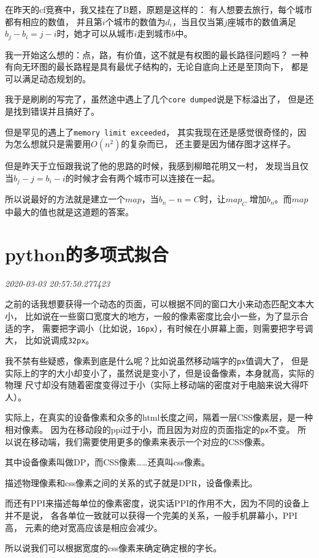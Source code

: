 \documentclass{peterlitsdoc}
\newcommand{\timetx}[1]
    {\par\noindent\emph{\pltgray\small #1}\vspace{2em}}
\newcommand{\vb}{\verb}
\begin{document}
在昨天的cf竞赛中，我又挂在了B题，原题是这样的：
有人想要去旅行，每个城市都有相应的数值，
并且第$i$个城市的数值为$d_i$，当且仅当第$j$座城市的数值满足
$b_j-b_i=j-i$时，她才可以从城市$i$走到城市$b$中。

我一开始这么想的：点，路，有价值，这不就是有权图的最长路径问题吗？
一种有向无环图的最长路程是具有最优子结构的，无论自底向上还是至顶向下，
都是可以满足动态规划的。

我于是刷刷的写完了，虽然途中遇上了几个\vb|core dumped|说是下标溢出了，
但是还是找到错误并且搞好了。

但是罕见的遇上了\vb|memory limit exceeded|，
其实我现在还是感觉很奇怪的，因为怎么想就只是需要用$O(n^2)$的复杂而已，
还主要是因为储存图才这样子。

但是昨天于立恒跟我说了他的思路的时候，我感到柳暗花明又一村，
发现当且仅当$b_j-j=b_i-i$的时候才会有两个城市可以连接在一起。

所以说最好的方法就是建立一个$map$，当$b_n-n=C$时，让$map_C$
增加$b_n$。而$map$中最大的值也就是这道题的答案。


\section{python的多项式拟合}\timetx{2020-03-03 20:57:50.277423}

之前的话我想要获得一个动态的页面，可以根据不同的窗口大小来动态匹配文本大小，
比如说在一些窗口宽度大的地方，一般的像素密度比会小一些，为了显示合适的字，
需要把字调小（比如说，\vb|16px|），有时候在小屏幕上面，则需要把字号调大，
比如说调成\vb|32px|。

我不禁有些疑惑，像素到底是什么呢？比如说虽然移动端字的\vb|px|值调大了，
但是实际上的字的大小却变小了，虽然说是变小了，但是设备像素，本身就高，实际的物理
尺寸却没有随着密度变得过于小（实际上移动端的密度对于电脑来说大得吓人）。

实际上，在真实的设备像素和众多的html长度之间，隔着一层CSS像素层，是一种相对像素。
因为在移动段的ppi过于小，而且因为对应的页面指定的\vb|px|不变。
所以说在移动端，我们需要使用更多的像素来表示一个对应的CSS像素。

其中设备像素叫做DP，而CSS像素\ldots\ldots 还真叫css像素。

描述物理像素和css像素之间的关系的式子就是DPR，设备像素比。

而还有PPI来描述每单位的像素密度，说实话PPI的作用不大，因为不同的设备上并不是说，
各各单位一致就可以获得一个完美的关系，一般手机屏幕小，PPI高，
元素的绝对宽高应该是相应会减少。

所以说我们可以根据宽度的css像素来确定确定根的字长。
\end{document}
